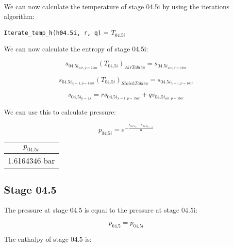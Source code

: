 \documentclass[titlepage]{article}
\begin{document}
    We can now calculate the temperature of stage 04.5i by using the iterations algorithm:

    \begin{center}
        \verb|Iterate_temp_h(h04.5i, r, q)| = $T_{04.5i}$
    \end{center}

    We can now calculate the entropy of stage 04.5i:

    \begin{equation}
        s_{04.5i_{air, p= 1 bar}}(T_{04.5i})_{Air Tables} = s_{04.5i_{air, p=1 bar}}
    \end{equation}

    \begin{equation}
        s_{04.5i_{\lambda=1, p= 1 bar}}(T_{04.5i})_{Stoich  Tables} = s_{04.5i_{\lambda=1, p = 1 bar}}
    \end{equation}

    \begin{equation}
        s_{04.5i_{p=1 \lambda}} = r s_{04.5i_{\lambda=1, p=1 bar}} + q s_{04.5i_{air, p=1 bar}}
    \end{equation}

    We can use this to calculate pressure:

    \begin{equation}
        p_{04.5i} = e^{ - \frac{s_{04.5i_{\lambda}} - s_{04.5i_{p=1 \lambda}}}{R}}
    \end{equation}

    \begin{center}
        \begin{tabular}{|c|}
            \hline
            $p_{04.5i}$ \\
            \hline
            1.6164346 bar \\
            \hline
        \end{tabular}
    \end{center}

    \subsection{Stage 04.5}

    The pressure at stage 04.5 is equal to the pressure at stage 04.5i:

    \begin{equation}
        p_{04.5} = p_{04.5i}
    \end{equation}

    The enthalpy of stage 04.5 is:
\end{document}
